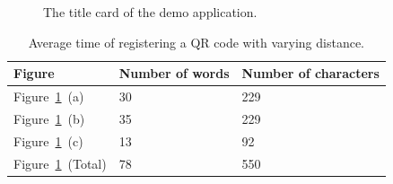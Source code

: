	\begin{figure}[H]%
		\centering
   		 \qquad
   		 \qquad
   		 \qquad
		\caption{The title card of the demo application.}
		\label{glassTestTextLengthS2Text}
	\end{figure}

	\begin{table}[ht!]
    		\caption{Average time of registering a QR code with varying distance.} \label{tab:glassTestTextLengthS2TextTable}
		\centering \begin{tabularx}{\textwidth}{l|X|X} \hline
		\textbf{Figure} & \textbf{Number of words} & \textbf{Number of characters} \\ \hline \hline
       
		Figure~\ref{glassTestTextLengthS2Text}~(a)	&30	&229	\\ \hline
		Figure~\ref{glassTestTextLengthS2Text}~(b)	&35	&229	\\ \hline
		Figure~\ref{glassTestTextLengthS2Text}~(c)	&13	&92	\\ \hline
		Figure~\ref{glassTestTextLengthS2Text}~(Total)	&78	&550	\\ \hline
		
		\end{tabularx}
	\end{table}


